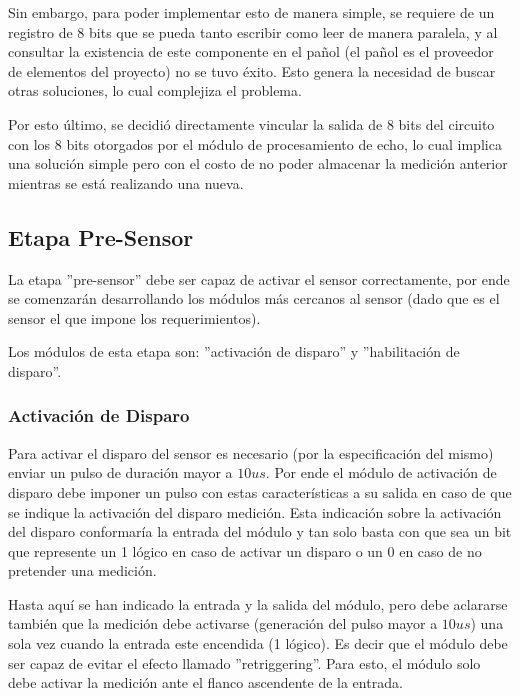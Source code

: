 Sin embargo, para poder implementar esto de manera simple, se requiere
de un registro de 8 bits que se pueda tanto escribir como leer de
manera paralela, y al consultar la existencia de este componente en
el pañol (el pañol es el proveedor de elementos del proyecto) no se
tuvo éxito. Esto genera la necesidad de buscar otras soluciones, lo
cual complejiza el problema. 

Por esto último, se decidió directamente vincular la salida de 8 bits
del circuito con los 8 bits otorgados por el módulo de procesamiento
de echo, lo cual implica una solución simple pero con el costo de
no poder almacenar la medición anterior mientras se está realizando
una nueva.

\subsection{Etapa Pre-Sensor}

La etapa ''pre-sensor'' debe ser capaz de activar el sensor correctamente,
por ende se comenzarán desarrollando los módulos más cercanos al sensor
(dado que es el sensor el que impone los requerimientos).

Los módulos de esta etapa son: ''activación de disparo'' y ''habilitación
de disparo''.

\subsubsection{Activación de Disparo}

Para activar el disparo del sensor es necesario (por la especificación
del mismo) enviar un pulso de duración mayor a $10us$. Por ende el
módulo de activación de disparo debe imponer un pulso con estas características
a su salida en caso de que se indique la activación del disparo medición.
Esta indicación sobre la activación del disparo conformaría la entrada
del módulo y tan solo basta con que sea un bit que represente un 1
lógico en caso de activar un disparo o un 0 en caso de no pretender
una medición.\newline

Hasta aquí se han indicado la entrada y la salida del módulo, pero
debe aclararse también que la medición debe activarse (generación
del pulso mayor a $10us$) una sola vez cuando la entrada este encendida
(1 lógico). Es decir que el módulo debe ser capaz de evitar
el efecto llamado ''retriggering''. Para esto, el módulo solo debe
activar la medición ante el flanco ascendente de la entrada.


